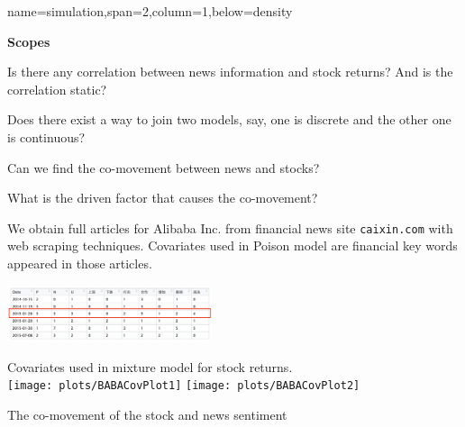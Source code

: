 \documentclass[a0paper,portrait,fontscale = 0.39,margin=2.5em]{baposter/baposter}
\begin{document}
\begin{poster}
{\begin{multicols}{2}
\begin{compactitem}
      \end{compactitem}


    \end{multicols}


  }

  {name=simulation,span=2,column=1,below=density}{

    \begin{multicols}{2}

      \begin{compactitem}

        \item \textbf{Scopes}

  \begin{compactitem}
  \item Is there any correlation between news information and stock returns? And is the
    correlation static?

  \item Does there exist a way to join two models, say, one is discrete and the other one
    is continuous?

  \item Can we find the co-movement between news and stocks?

  \item What is the driven factor that causes the co-movement?

  \end{compactitem}


      \item We obtain full articles for Alibaba Inc. from financial news site
        {\color{blue} \texttt{caixin.com}} with web scraping techniques. Covariates
        used in Poison model are financial key words appeared in those articles.

        \includegraphics[width=0.45\textwidth]{plots/TextsCovs-New}

      \item Covariates used in mixture model for stock returns.\\

        \texttt{[image: plots/BABACovPlot1]}
        \texttt{[image: plots/BABACovPlot2]}

      \item The co-movement of the stock and news sentiment


\end{compactitem}
\end{multicols}}
\end{poster}
\end{document}
